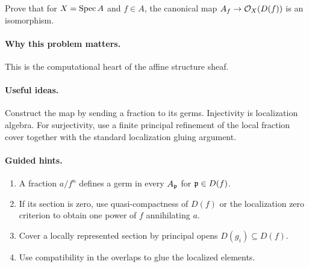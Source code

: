 \begin{problem}\label{prob:vi17-p02}
Prove that for $X=\operatorname{Spec} A$ and $f\in A$, the canonical map $A_f\to\mathcal O_X(D(f))$ is an isomorphism.
\end{problem}

\ifdefined\FullProblemDossiers
\paragraph{Why this problem matters.}
This is the computational heart of the affine structure sheaf.

\paragraph{Useful ideas.}
Construct the map by sending a fraction to its germs.  Injectivity is localization algebra.  For surjectivity, use a finite principal refinement of the local fraction cover together with the standard localization gluing argument.

\paragraph{Guided hints.}
\begin{enumerate}
\item A fraction $a/f^n$ defines a germ in every $A_{\mathfrak p}$ for $\mathfrak p\in D(f)$.
\item If its section is zero, use quasi-compactness of $D(f)$ or the localization zero criterion to obtain one power of $f$ annihilating $a$.
\item Cover a locally represented section by principal opens $D(g_i)\subseteq D(f)$.
\item Use compatibility in the overlaps to glue the localized elements.
\end{enumerate}

